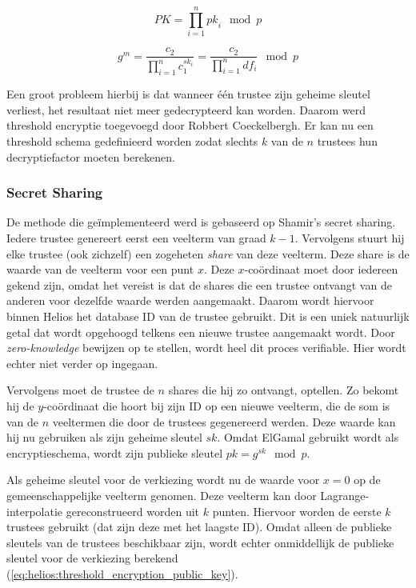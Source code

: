 \begin{equation}
  \label{eq:helios:elgamal_c2_homomorphic_trustees}
  PK = \prod_{i=1}^n{{pk}_i} \mod{p}
\end{equation}

\begin{equation}
  \label{eq:helios:elgamal_m_homomorphic_trustees}
  g^m = \frac{c_2}{\prod_{i=1}^n{c_1^{{sk}_i}}} = \frac{c_2}{\prod_{i=1}^n{{df}_i}} \mod{p}
\end{equation}

\npar Een groot probleem hierbij is dat wanneer \'e\'en trustee zijn geheime sleutel verliest, het resultaat niet meer gedecrypteerd kan worden. Daarom werd threshold encryptie toegevoegd door Robbert Coeckelbergh.\cite{coeckelbergh_toepassing_en_uitbreiding_van_het_helios_online_verkiezingssysteem} Er kan nu een threshold schema gedefinieerd worden zodat slechts $k$ van de $n$ trustees hun decryptiefactor moeten berekenen.

\subsubsection{Secret Sharing}

De methode die ge\"implementeerd werd is gebaseerd op Shamir's secret sharing.\cite{shamir_how_to_share_a_secret} Iedere trustee genereert eerst een veelterm van graad $k - 1$. Vervolgens stuurt hij elke trustee (ook zichzelf) een zogeheten \textit{share} van deze veelterm. Deze share is de waarde van de veelterm voor een punt $x$. Deze $x$-co\"ordinaat moet door iedereen gekend zijn, omdat het vereist is dat de shares die een trustee ontvangt van de anderen voor dezelfde waarde werden aangemaakt. Daarom wordt hiervoor binnen Helios het database ID van de trustee gebruikt. Dit is een uniek natuurlijk getal dat wordt opgehoogd telkens een nieuwe trustee aangemaakt wordt. Door \textit{zero-knowledge} bewijzen op te stellen, wordt heel dit proces verifiable. Hier wordt echter niet verder op ingegaan.

\npar Vervolgens moet de trustee de $n$ shares die hij zo ontvangt, optellen. Zo bekomt hij de $y$-co\"ordinaat die hoort bij zijn ID op een nieuwe veelterm, die de som is van de $n$ veeltermen die door de trustees gegenereerd werden. Deze waarde kan hij nu gebruiken als zijn geheime sleutel ${sk}$. Omdat ElGamal gebruikt wordt als encryptieschema, wordt zijn publieke sleutel ${pk} = g^{sk} \mod{p}$.

\npar Als geheime sleutel voor de verkiezing wordt nu de waarde voor $x = 0$ op de gemeenschappelijke veelterm genomen. Deze veelterm kan door Lagrange-interpolatie gereconstrueerd worden uit $k$ punten. Hiervoor worden de eerste $k$ trustees gebruikt (dat zijn deze met het laagste ID). Omdat alleen de publieke sleutels van de trustees beschikbaar zijn, wordt echter onmiddellijk de publieke sleutel voor de verkiezing berekend (\ref{eq:helios:threshold_encryption_public_key}).


